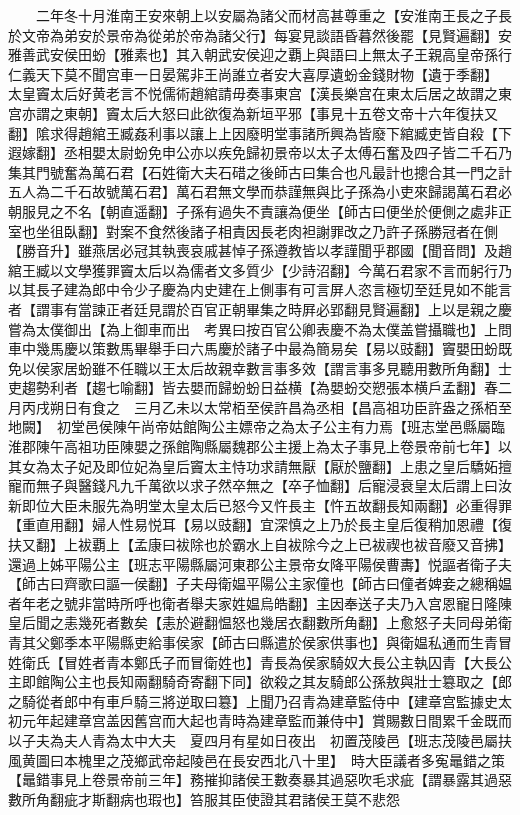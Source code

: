 　　二年冬十月淮南王安來朝上以安屬為諸父而材高甚尊重之【安淮南王長之子長於文帝為弟安於景帝為從弟於帝為諸父行】每宴見談語昏暮然後罷【見賢遍翻】安雅善武安侯田蚡【雅素也】其入朝武安侯迎之覇上與語曰上無太子王親高皇帝孫行仁義天下莫不聞宫車一日晏駕非王尚誰立者安大喜厚遺蚡金錢財物【遺于季翻】　太皇竇太后好黄老言不悦儒術趙綰請毋奏事東宫【漢長樂宫在東太后居之故謂之東宫亦謂之東朝】竇太后大怒曰此欲復為新垣平邪【事見十五卷文帝十六年復扶又翻】隂求得趙綰王臧姦利事以讓上上因廢明堂事諸所興為皆廢下綰臧吏皆自殺【下遐嫁翻】丞相嬰太尉蚡免申公亦以疾免歸初景帝以太子太傅石奮及四子皆二千石乃集其門號奮為萬石君【石姓衛大夫石碏之後師古曰集合也凡最計也摠合其一門之計五人為二千石故號萬石君】萬石君無文學而恭謹無與比子孫為小吏來歸謁萬石君必朝服見之不名【朝直遥翻】子孫有過失不責讓為便坐【師古曰便坐於便側之處非正室也坐徂臥翻】對案不食然後諸子相責因長老肉袒謝罪改之乃許子孫勝冠者在側【勝音升】雖燕居必冠其執喪哀戚甚悼子孫遵教皆以孝謹聞乎郡國【聞音問】及趙綰王臧以文學獲罪竇太后以為儒者文多質少【少詩沼翻】今萬石君家不言而躬行乃以其長子建為郎中令少子慶為内史建在上側事有可言屏人恣言極切至廷見如不能言者【謂事有當諫正者廷見謂於百官正朝畢集之時屛必郢翻見賢遍翻】上以是親之慶嘗為太僕御出【為上御車而出　考異曰按百官公卿表慶不為太僕盖嘗攝職也】上問車中幾馬慶以策數馬畢舉手曰六馬慶於諸子中最為簡易矣【易以豉翻】竇嬰田蚡既免以侯家居蚡雖不任職以王太后故親幸數言事多效【謂言事多見聽用數所角翻】士吏趨勢利者【趨七喻翻】皆去嬰而歸蚡蚡日益横【為嬰蚡交愬張本横戶孟翻】春二月丙戌朔日有食之　三月乙未以太常栢至侯許昌為丞相【昌高祖功臣許盎之孫栢至地闕】　初堂邑侯陳午尚帝姑館陶公主嫖帝之為太子公主有力焉【班志堂邑縣屬臨淮郡陳午高祖功臣陳嬰之孫館陶縣屬魏郡公主援上為太子事見上卷景帝前七年】以其女為太子妃及即位妃為皇后竇太主恃功求請無厭【厭於鹽翻】上患之皇后驕妬擅寵而無子與醫錢凡九千萬欲以求子然卒無之【卒子恤翻】后寵浸衰皇太后謂上曰汝新即位大臣未服先為明堂太皇太后已怒今又忤長主【忤五故翻長知兩翻】必重得罪【重直用翻】婦人性易悦耳【易以豉翻】宜深慎之上乃於長主皇后復稍加恩禮【復扶又翻】上袚覇上【孟康曰袚除也於霸水上自袚除今之上已袚禊也袚音廢又音拂】還過上姊平陽公主【班志平陽縣屬河東郡公主景帝女降平陽侯曹夀】悦謳者衛子夫【師古曰齊歌曰謳一侯翻】子夫母衛媪平陽公主家僮也【師古曰僮者婢妾之總稱媪者年老之號非當時所呼也衛者舉夫家姓媪烏皓翻】主因奉送子夫乃入宫恩寵日隆陳皇后聞之恚幾死者數矣【恚於避翻愠怒也幾居衣翻數所角翻】上愈怒子夫同母弟衛青其父鄭季本平陽縣吏給事侯家【師古曰縣遣於侯家供事也】與衛媪私通而生青冒姓衛氏【冒姓者青本鄭氏子而冒衛姓也】青長為侯家騎奴大長公主執囚青【大長公主即館陶公主也長知兩翻騎奇寄翻下同】欲殺之其友騎郎公孫敖與壯士簒取之【郎之騎從者郎中有車戶騎三將逆取曰簒】上聞乃召青為建章監侍中【建章宫監據史太初元年起建章宫盖因舊宫而大起也青時為建章監而兼侍中】賞賜數日間累千金既而以子夫為夫人青為太中大夫　夏四月有星如日夜出　初置茂陵邑【班志茂陵邑屬扶風黄圖曰本槐里之茂鄉武帝起陵邑在長安西北八十里】　時大臣議者多寃鼂錯之策【鼂錯事見上卷景帝前三年】務摧抑諸侯王數奏暴其過惡吹毛求疵【謂暴露其過惡數所角翻疵才斯翻病也瑕也】笞服其臣使證其君諸侯王莫不悲怨

